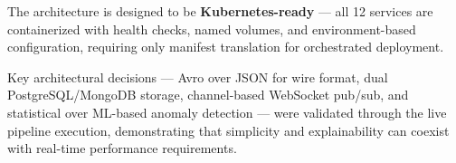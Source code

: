 \documentclass[12pt,a4paper]{article}
\begin{document}
The architecture is designed to be \textbf{Kubernetes-ready} --- all 12 services are containerized with health checks, named volumes, and environment-based configuration, requiring only manifest translation for orchestrated deployment.

Key architectural decisions --- Avro over JSON for wire format, dual PostgreSQL/MongoDB storage, channel-based WebSocket pub/sub, and statistical over ML-based anomaly detection --- were validated through the live pipeline execution, demonstrating that simplicity and explainability can coexist with real-time performance requirements.
\end{document}

